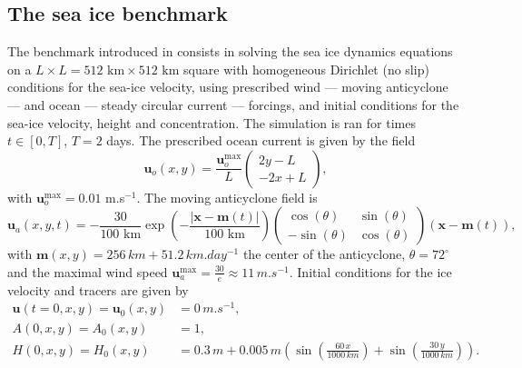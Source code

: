 \documentclass[11pt]{article}
\newcommand{\bu}{\mathbf{u}}
\begin{document}
\subsection{The sea ice benchmark}
The benchmark introduced in \cite{Mehlmann2017, MehlmannLKF2021} consists in solving the sea ice dynamics equations on a $L \times L =  512 \text{ km} \times 512 \text{ km}$ square with homogeneous Dirichlet (no slip) conditions for the sea-ice velocity, using prescribed wind --- moving anticyclone --- and ocean --- steady circular current --- forcings, and initial conditions for the sea-ice velocity, height and concentration. The simulation is ran for times $t \in [0, T]$, $T=2$ days. The prescribed ocean current is given by the field 
\begin{equation}
\bu_o(x,y)=\frac{\bu_o^\text{max}}{L}
\begin{pmatrix}
2y-L \\
-2x+L
\end{pmatrix},
\label{eq:ocean_velocity}
\end{equation}with $\bu_o^\text{max} = 0.01$ m.s$^{-1}$. The moving anticyclone field is 
\begin{equation}
\bu_a(x,y,t)=
-\frac{30}{100 \text{ km}} \exp\left(
-\frac{|\mathbf{x} -\mathbf{m}(t)|}{100 \text{ km}}
\right)
\begin{pmatrix}
\cos (\theta) & \sin (\theta)\\
-\sin (\theta) & \cos (\theta)
\end{pmatrix} \left ( \mathbf{x}-\mathbf{m}(t)\right ),
\label{eq:wind_velocity}
\end{equation}
with $\mathbf{m}(x,y) = 256\,\unit{km} + 51.2\,\unit{km.day^{-1}}$ the center of the anticyclone,  $\theta=72^\circ$ and the maximal wind speed $\bu_a^\text{max} = \frac{30}{e} \approx 11\,\unit{m.s^{-1}}$. Initial conditions for the ice velocity and tracers are given by
\begin{align}
    \bu(t = 0, x, y) = \bu_0(x, y) &= 0\,\unit{m.s^{-1}},\\
     A(0, x, y) = A_0(x,y)& = 1,\\
     H(0, x, y) = H_0(x,y)& = 0.3\,\unit{m}+ 0.005\,\unit{m}\left ( \sin\left(\frac{60\, x}{1000\,\unit{km}}\right) + \sin \left (\frac{30\, y}{1000\,\unit{km}}\right ) \right ).
\end{align}
\end{document}
